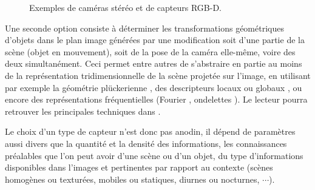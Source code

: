 \begin{figure}[!ht]
  \centering
\hfill
    \caption{\footnotesize{Exemples de cam\'eras st\'er\'eo et de capteurs RGB-D.}}
\label{chap01:fig02}
\end{figure}

Une seconde option consiste \`a d\'eterminer les transformations g\'eom\'etriques d'ob\-jets dans le plan image g\'en\'er\'ees par une modification soit d'une partie de la sc\`ene (objet en mouvement), soit de la pose de la cam\'era elle-m\^eme, voire des deux simultan\'ement. Ceci permet entre autres de s'abstraire en partie au moins de la repr\'esentation tridimensionnelle de la sc\`ene projet\'ee sur l'image, en utilisant par exemple la g\'eom\'etrie pl\"uckerienne \cite{andreff:inria-00072393}, des descripteurs locaux ou globaux \cite{latuan2010}, ou encore des repr\'esentations fr\'equentielles (Fourier \cite{chari2008}, ondelettes \cite{ramosvelasco2012}). Le lecteur pourra retrouver les principales techniques dans \cite{marchand2005}.

Le choix d'un type de capteur n'est donc pas anodin, il d\'epend de param\`etres aussi divers que la quantit\'e et la densit\'e des informations, les connaissances pr\'ealables que l'on peut avoir d'une sc\`ene ou d'un objet, du type d'informations disponibles dans l'images et pertinentes par rapport au contexte (sc\`enes homog\`enes ou textur\'ees, mobiles ou statiques, diurnes ou nocturnes, $\cdots$).

